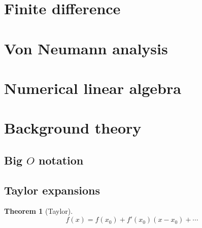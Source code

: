 \documentclass[11pt, a4paper]{article}
\theoremstyle{break}
\newtheorem{thm}{Theorem}[section]
\begin{document}
\section{Finite difference}


\section{Von Neumann analysis}


\section{Numerical linear algebra}


\appendix
\section{Background theory}
\subsection{\texorpdfstring{Big $O$}{Big O} notation}\label{sec:bigO}
\subsection{Taylor expansions}\label{sec:taylor}
\begin{thm}[Taylor]\label{thm:taylor}
	\[f(x)=f(x_0)+f'(x_0)(x-x_0) + \cdots\]
\end{thm}

\nocite{*}



\label{lastpage}
\end{document}
